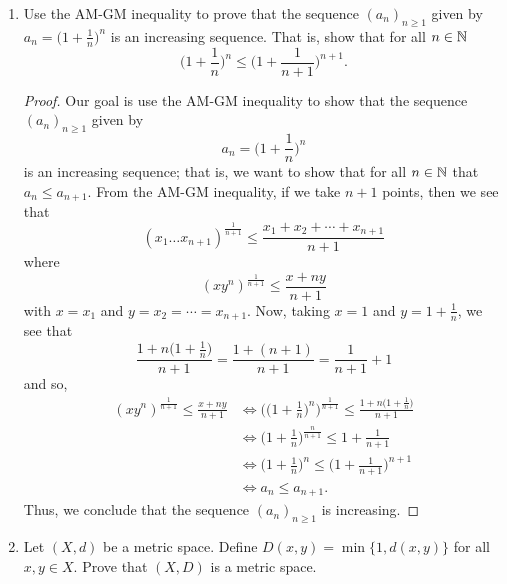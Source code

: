 \documentclass{article}
\begin{document}
\begin{enumerate}
    \item Use the AM-GM inequality to prove that the sequence \( ({a}_{n})_{n \geq1} \) given by \( {a}_{n} = \Big(  1 + \frac{ 1  }{ n }  \Big)^{n} \) is an increasing sequence. That is, show that for all \( n \in \mathbb{N}  \)
        \[  \Big(  1 + \frac{ 1 }{ n }  \Big)^{n} \leq \Big(  1 + \frac{ 1 }{ n+1 }  \Big)^{n+1}. \]
        \begin{proof}
            Our goal is use the AM-GM inequality to show that the sequence \( ({a}_{n})_{n \geq 1} \) given by 
            \[  {a}_{n} = \Big(  1 + \frac{ 1 }{ n }  \Big)^{n} \]
            is an increasing sequence; that is, we want to show that for all \( n \in \mathbb{N}  \) that \( {a}_{n} \leq {a}_{n+1} \). From the AM-GM inequality, if we take \( n + 1  \) points, then we see that 
            \[  ({x}_{1} \dots {x}_{n+1})^{\frac{ 1 }{ n+1 } } \leq \frac{ {x}_{1} + {x}_{2} + \cdots + {x}_{n+1} }{ n + 1  } \]
            where
            \[   (x y^{n})^{\frac{ 1 }{ n+1 } } \leq \frac{ x + ny }{ n+1 }  \]
            with \( x = {x}_{1} \) and \( y = {x}_{2} = \cdots = {x}_{n+1} \). Now, taking \( x = 1  \) and \( y = 1 + \frac{ 1 }{ n }  \), we see that 
            \[  \frac{ 1 + n \Big(  1 + \frac{ 1 }{ n }  \Big) }{ n+1 }  = \frac{ 1 + (n+1) }{ n+1 }  = \frac{ 1 }{ n+1 }  + 1 \]
            and so,
            \begin{align*}
                (x y^{n})^{\frac{ 1 }{ n+1 } } \leq \frac{ x + ny }{ n + 1 }   &\Longleftrightarrow \Bigg( \Big(  1 + \frac{ 1 }{ n }  \Big)^{n}  \Bigg)^{\frac{ 1 }{ n+1 } } \leq \frac{ 1 + n \Big(  1 + \frac{ 1 }{ n }  \Big) }{ n + 1  }   \\
                                                                               &\Longleftrightarrow \Big(  1 + \frac{ 1 }{ n }  \Big)^{\frac{ n }{ n+1 } } \leq 1 + \frac{ 1 }{ n+1 } \\  
                                                                               &\Longleftrightarrow \Big(  1 + \frac{ 1 }{ n }  \Big)^{n} \leq \Big(  1 + \frac{ 1 }{ n+1 }  \Big)^{n+1} \\
                                                                               &\Longleftrightarrow {a}_{n} \leq {a}_{n+1}.
            \end{align*}
            Thus, we conclude that the sequence \( ({a}_{n})_{n \geq 1} \) is increasing.
        \end{proof}
    \item Let \( (X,d) \) be a metric space. Define \( D(x,y) = \min \{ 1 , d(x,y) \}  \) for all \( x,y \in X  \). Prove that \( (X,D) \) is a metric space. 

\end{enumerate}
\end{document}
